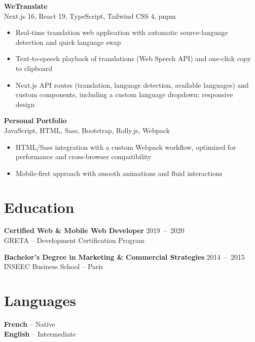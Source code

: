 \documentclass[9pt,a4paper]{extarticle}
\newcommand{\secgap}{\vspace{0.8em}}
\newcommand{\entry}[3]{%
  \vspace{0.25em}%
  {\bfseries #1} \hfill {\color{grey}\footnotesize\mbox{#2}}\\[-1pt]
  {\color{accent}\footnotesize #3}\par\vspace{0.1em}%
}
\begin{document}
\begin{minipage}[t]{0.488\textwidth}
\entry{WeTranslate}{}{Next.js 16, React 19, TypeScript, Tailwind CSS 4, pnpm}
\begin{itemize}
  \item Real-time translation web application with automatic source-language detection and quick language swap
  \item Text-to-speech playback of translations (Web Speech API) and one-click copy to clipboard
  \item Next.js API routes (translation, language detection, available languages) and custom components, including a custom language dropdown; responsive design
\end{itemize}

\entry{Personal Portfolio}{}{JavaScript, HTML, Sass, Bootstrap, Rolly.js, Webpack}
\begin{itemize}
  \item HTML/Sass integration with a custom Webpack workflow, optimized for performance and cross-browser compatibility
  \item Mobile-first approach with smooth animations and fluid interactions
\end{itemize}

\secgap
\section{Education}
\entry{Certified Web \& Mobile Web Developer}{2019 -- 2020}{GRETA -- Development Certification Program}
\entry{Bachelor's Degree in Marketing \& Commercial Strategies}{2014 -- 2015}{INSEEC Business School -- Paris}

\secgap
\section{Languages}
\textbf{French} -- Native\\
\textbf{English} -- Intermediate
\end{minipage}
\end{document}
